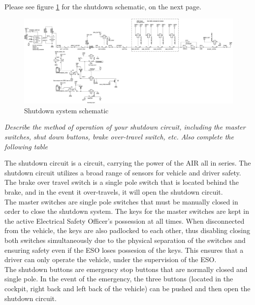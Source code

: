 \documentclass{article}
\begin{document}
Please see figure \ref{shutdownschem} for the shutdown schematic, on the next page.

        \begin{figure}
            \includegraphics[width=\textheight]{shutdownsystem}
            \caption{Shutdown system schematic}
            \label{shutdownschem}
        \end{figure}


\textit{Describe the method of operation of your shutdown circuit, including the master switches, shut down buttons, brake over-travel switch, etc. Also complete the following table}

The shutdown circuit is a circuit, carrying the power of the AIR all in series. The shutdown circuit utilizes a broad range of sensors for vehicle and driver safety.
The brake over travel switch is a single pole switch that is located behind the brake, and in the event it over-travels, it will open the shutdown circuit.\\

The master switches are single pole switches that must be manually closed in order to close the shutdown system. The keys for the master switches are kept in the active Electrical Safety Officer's possession at all times. When disconnected from the vehicle, the keys are also padlocked to each other, thus disabling closing both switches simultaneously due to the physical separation of the switches and ensuring safety even if the ESO loses possesion of the keys. This ensures that a driver can only operate the vehicle, under the supervision of the ESO.\\

The shutdown buttons are emergency stop buttons that are normally closed and single pole. In the event of the emergency, the three buttons (located in the cockpit, right back and left back of the vehicle) can be pushed and then open the shutdown circuit.\\
\end{document}
